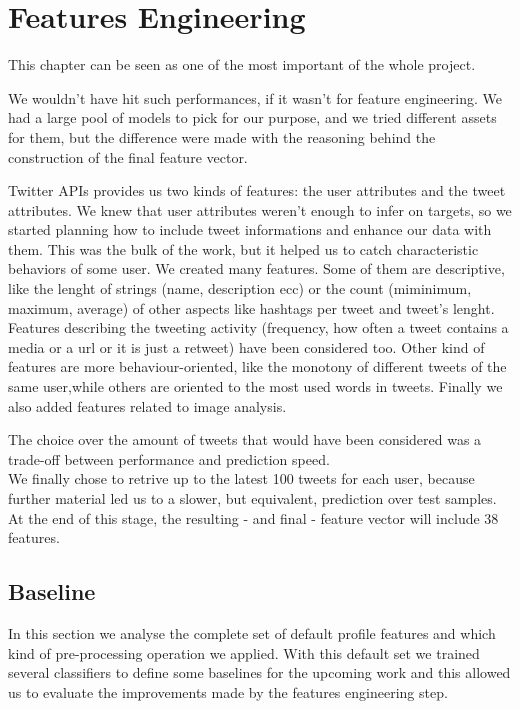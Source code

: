 \chapter{Features Engineering}
\label{capitolo4}
\thispagestyle{empty}

This chapter can be seen as one of the most important of the whole project.

We wouldn't have hit such performances, if it wasn't for feature engineering. We had a large pool of models to pick for our purpose,  and we tried different assets for them, but the difference were made with the reasoning behind the construction of the final feature vector.

Twitter APIs provides us two kinds of features: the user attributes and the tweet attributes.
We knew that user attributes weren't enough to infer on targets, so we started planning how to include tweet informations and enhance our data with them. This was the bulk of the work, but it helped us to catch characteristic behaviors of some user.
We created many features. Some of them are descriptive, like the lenght of strings (name, description ecc) or the count (miminimum, maximum, average) of other aspects like hashtags per tweet and tweet's lenght. Features describing the tweeting activity (frequency, how often a tweet contains a media or a url or it is just a retweet) have been considered too.
Other kind of features are more behaviour-oriented, like the monotony of different tweets of the same user,while others are oriented to the most used words in tweets.
Finally we also added features related to image analysis.

The choice over the amount of tweets that would have been considered was a trade-off between performance and prediction speed.\\
We finally chose to retrive up to the latest 100 tweets for each user, because further material led us to a slower, but equivalent, prediction over test samples.\\
At the end of this stage, the resulting - and final - feature vector will include 38 features.

\section{Baseline}
In this section we analyse the complete set of default profile features and which kind of pre-processing operation we applied. With this default set we trained several classifiers to define some baselines for the upcoming work and this allowed us to evaluate the improvements made by the features engineering step.

